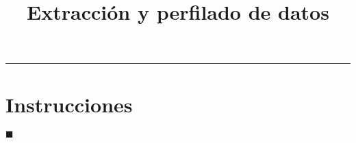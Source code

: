 \documentclass[12pt]{article}
\title{Extracción y perfilado de datos}
\newcommand{\QED}{\begin{flushright}$\blacksquare$\end{flushright}}
\begin{document}




\vspace{1.5 cm}
\hrule
\vspace{0.5 cm}

\section*{Instrucciones}



\newpage



\QED
\end{document}

